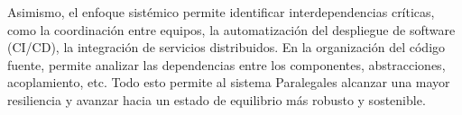 Asimismo, el enfoque sistémico permite identificar interdependencias críticas, como la coordinación entre equipos, la automatización del despliegue de software (CI/CD), la integración de servicios distribuidos. En la organización del código fuente, permite analizar las dependencias entre los componentes, abstracciones, acoplamiento, etc. Todo esto permite al sistema Paralegales alcanzar una mayor resiliencia y avanzar hacia un estado de equilibrio más robusto y sostenible.
